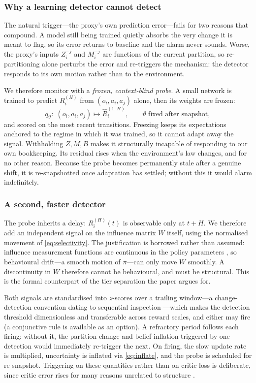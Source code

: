 \documentclass[conference]{IEEEtran}
\begin{document}
\subsubsection{Why a learning detector cannot detect}
The natural trigger---the proxy's own prediction error---fails for two reasons that compound. A model still being trained quietly absorbs the very change it is meant to flag, so its error returns to baseline and the alarm never sounds. Worse, the proxy's inputs $Z^{-j}_i$ and $M^{-j}_i$ are functions of the current partition, so re-partitioning alone perturbs the error and re-triggers the mechanism: the detector responds to its own motion rather than to the environment.

We therefore monitor with a \emph{frozen, context-blind probe}. A small network is trained to predict $R_i^{(H)}$ from $(o_i,a_i,a_j)$ alone, then its weights are frozen:
\begin{equation}
q_\vartheta:\;(o_i,a_i,a_j)\longmapsto \hat{R}^{(1..H)}_i,
\qquad
\vartheta\;\text{fixed after snapshot},
\label{eq:probe}
\end{equation}
and scored on the most recent transitions. Freezing keeps its expectations anchored to the regime in which it was trained, so it cannot adapt away the signal. Withholding $Z,M,B$ makes it structurally incapable of responding to our own bookkeeping. Its residual rises when the environment's law changes, and for no other reason. Because the probe becomes permanently stale after a genuine shift, it is re-snapshotted once adaptation has settled; without this it would alarm indefinitely.

\subsubsection{A second, faster detector}
The probe inherits a delay: $R_i^{(H)}(t)$ is observable only at $t+H$. We therefore add an independent signal on the influence matrix $W$ itself, using the normalised movement of \eqref{eq:selectivity}. The justification is borrowed rather than assumed: influence measurement functions are continuous in the policy parameters \cite{pieroth2024influence}, so behavioural drift---a smooth motion of $\pi$---can only move $W$ smoothly. A discontinuity in $W$ therefore cannot be behavioural, and must be structural. This is the formal counterpart of the tier separation the paper argues for.

Both signals are standardised into $z$-scores over a trailing window---a change-detection convention dating to sequential inspection \cite{page1954cusum}---which makes the detection threshold dimensionless and transferable across reward scales, and either may fire (a conjunctive rule is available as an option). A refractory period follows each firing: without it, the partition change and belief inflation triggered by one detection would immediately re-trigger the next. On firing, the slow update rate is multiplied, uncertainty is inflated via \eqref{eq:inflate}, and the probe is scheduled for re-snapshot. Triggering on these quantities rather than on critic loss is deliberate, since critic error rises for many reasons unrelated to structure \cite{zhang2024corep}.
\end{document}
